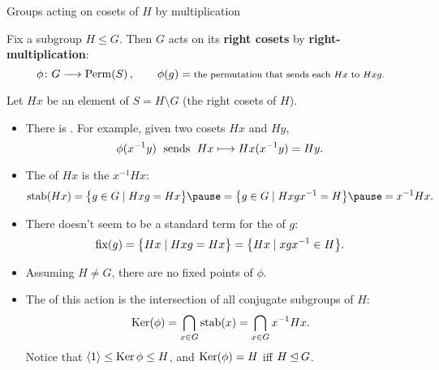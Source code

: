 \documentclass[8pt]{beamer}
\newcommand{\Pause}{\pause}      %
\begin{document}

\begin{frame}{Groups acting on cosets of $H$ by multiplication} %
  
  Fix a subgroup $H\leq G$. Then $G$ acts on its \textbf{right cosets}
  by \textbf{right-multiplication}:
  \[
  \phi\colon G\longrightarrow\operatorname{Perm}(S)\,,\qquad
  \phi(g)=\mbox{\footnotesize the permutation that sends each $Hx$ to
    $Hxg$.}
  \]
  
  \Pause
  
  Let $Hx$ be an element of $S=H\!\setminus\!G$ (the right cosets of
  $H$). \Pause
  \begin{itemize}
  \item There is . \Pause For example, given two cosets
    $Hx$ and $Hy$,
    \[
    \text{$\phi(x^{-1}y)$\; sends\; $Hx\longmapsto Hx(x^{-1}y)=Hy$}.
    \]   
    \vspace{-4mm}\Pause
  \item The  of $Hx$ is the
     $x^{-1}Hx$: 
    \[
    \stab(Hx)=\big\{g\in G\mid Hxg=Hx\big\}\Pause=\big\{g\in G\mid
    Hxgx^{-1}=H\big\} \Pause=x^{-1}Hx.
    \]
    \vspace{-4mm}\Pause    
  \item There doesn't seem to be a standard term for the
     of $g$:
    \[
    \operatorname{fix}(g)=\big\{Hx\mid Hxg=Hx\big\}=\big\{Hx\mid xgx^{-1}\in H\big\}.
    \]
    \vspace{-4mm}\Pause
  \item Assuming $H\neq G$, there are {\color{xGreen}no fixed
    points} of $\phi$. 

    \smallskip\Pause
    
  \item The  of this action is the intersection of all
    conjugate subgroups of $H$:
    \[
    \operatorname{Ker}(\phi)=\bigcap_{x\in G}\operatorname{stab}(x)=\bigcap_{x\in G}x^{-1}Hx.
    \]
    \Pause Notice that $\langle1\rangle\leq\operatorname{Ker}\phi\leq H$, and $\operatorname{Ker}(\phi)=H$ iff
    $H\unlhd G$.
  \end{itemize}
  
\end{frame}

\end{document}
